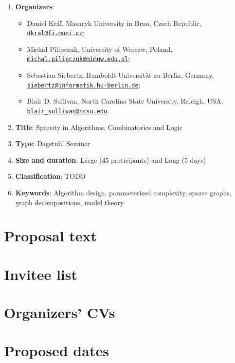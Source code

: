\documentclass[10pt]{article}
\newcommand{\ourtitle}{Sparsity in Algorithms, Combinatorics and Logic}
\newcommand{\email}[1]{\href{mailto:#1}{\nolinkurl{#1}}}
\begin{document}
\begin{enumerate}
\item {\bf{Organizers}}:
\begin{itemize}
\item Daniel Kr\'a\v{l}, Masaryk University in Brno, Czech Republic, \email{dkral@fi.muni.cz};
\item Micha\l{} Pilipczuk, University of Warsaw, Poland, \email{michal.pilipczuk@mimuw.edu.pl};
\item Sebastian Siebertz, Humboldt-Universit\"at zu Berlin, Germany, \mbox{\email{siebertz@informatik.hu-berlin.de};}
\item Blair D. Sullivan, North Carolina State University, Raleigh, USA, \email{blair_sullivan@ncsu.edu}.
\end{itemize}
\item {\bf{Title}}: \ourtitle
\item {\bf{Type}}: Dagstuhl Seminar
\item {\bf{Size and duration}}: Large (45 participants) and Long (5 days)
\item {\bf{Classification}}: TODO
\item {\bf{Keywords}}: Algorithm design, parameterized complexity, sparse graphs, graph decompositions, model theory.
\end{enumerate}

\pagebreak
\section{Proposal text}











\section{Invitee list}



\section{Organizers' CVs}

\section{Proposed dates}





\end{document}
